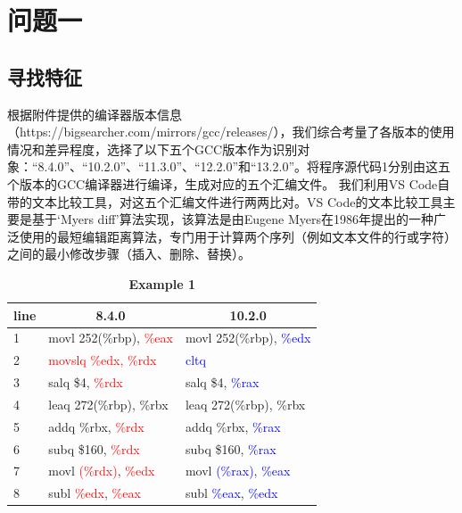 \section{问题一}
\subsection{寻找特征}
根据附件提供的编译器版本信息（https://bigsearcher.com/mirrors/gcc/releases/），我们综合考量了各版本的使用情况和差异程度，选择了以下五个GCC版本作为识别对象：“8.4.0”、“10.2.0”、“11.3.0”、“12.2.0”和“13.2.0”。将程序源代码1分别由这五个版本的GCC编译器进行编译，生成对应的五个汇编文件。
我们利用VS Code自带的文本比较工具，对这五个汇编文件进行两两比对。VS Code的文本比较工具主要是基于‘Myers diff’算法实现，该算法是由Eugene Myers在1986年提出的一种广泛使用的最短编辑距离算法，专门用于计算两个序列（例如文本文件的行或字符）之间的最小修改步骤（插入、删除、替换）。
\begin{table}[H]
\caption{\textbf{Example 1}}%
\centering%
\begin{tabular}{l|l|l}%

\toprule%
\multicolumn{1}{c}{line} & \multicolumn{1}{c}{8.4.0} & \multicolumn{1}{c}{10.2.0} \\
\midrule%
1 &movl	252(\%rbp), \textcolor{red}{\%eax}&movl	252(\%rbp), \textcolor{blue}{\%edx} \\
  2 &\textcolor{red}{movslq	\%edx, \%rdx}&\textcolor{blue}{cltq}\\
3 &salq	\$4, \textcolor{red}{\%rdx}&salq	\$4, \textcolor{blue}{\%rax}\\
4 &leaq	272(\%rbp), \%rbx&leaq	272(\%rbp), \%rbx\\
5 &addq	\%rbx, \textcolor{red}{\%rdx}&addq	\%rbx, \textcolor{blue}{\%rax}\\
6 &subq	\$160, \textcolor{red}{\%rdx}&subq	\$160, \textcolor{blue}{\%rax}\\
7 &movl	\textcolor{red}{(\%rdx)}, \textcolor{red}{\%edx}&movl	\textcolor{blue}{(\%rax)}, \textcolor{blue}{\%eax}\\
8 &subl	\textcolor{red}{\%edx}, \textcolor{red}{\%eax}&subl	\textcolor{blue}{\%eax}, \textcolor{blue}{\%edx} \\
\bottomrule%
\end{tabular}
\end{table}



